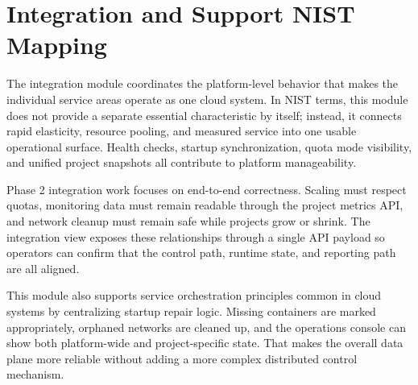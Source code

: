 \documentclass[11pt]{article}
\begin{document}
\section*{Integration and Support NIST Mapping}
The integration module coordinates the platform-level behavior that makes the individual service areas operate as one cloud system. In NIST terms, this module does not provide a separate essential characteristic by itself; instead, it connects rapid elasticity, resource pooling, and measured service into one usable operational surface. Health checks, startup synchronization, quota mode visibility, and unified project snapshots all contribute to platform manageability.

Phase 2 integration work focuses on end-to-end correctness. Scaling must respect quotas, monitoring data must remain readable through the project metrics API, and network cleanup must remain safe while projects grow or shrink. The integration view exposes these relationships through a single API payload so operators can confirm that the control path, runtime state, and reporting path are all aligned.

This module also supports service orchestration principles common in cloud systems by centralizing startup repair logic. Missing containers are marked appropriately, orphaned networks are cleaned up, and the operations console can show both platform-wide and project-specific state. That makes the overall data plane more reliable without adding a more complex distributed control mechanism.
\end{document}
